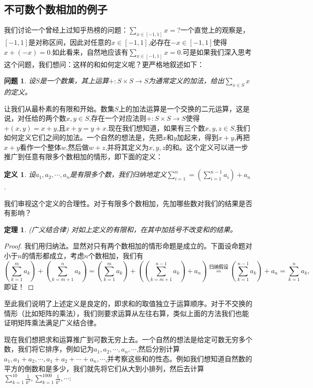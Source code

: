\documentclass{article}
\newtheorem{definition}{定义}[subsection]
\newtheorem{theorem}{定理}[subsection]
\newtheorem{question}{问题}[subsection]
\begin{document}
\subsection{不可数个数相加的例子}
我们讨论一个曾经上过知乎热榜的问题：$\sum_{x\in[-1,1]}x=?$一个直觉上的观察是，$[-1,1]$是对称区间，因此对任意的$x\in[-1,1]$,必存在$-x\in[-1,1]$使得$x+(-x)=0$.如此看来，自然地应该有$\sum_{x\in[-1,1]}x=0$.可是如果我们深入思考这个问题，我们想问：这样的和如何定义呢？更严格地叙述如下：
\begin{question}
设$S$是一个数集，其上运算$+:S\times S\to S$为通常定义的加法，给出$\sum_{x\in S}x$的定义。
\end{question}
让我们从最朴素的有限和开始。数集$S$上的加法运算是一个交换的二元运算，这是说，对任给的两个数$x,y\in S$,存在一个对应法则$+:S\times S\to S$使得$+(x,y)=x+y$,且$x+y=y+x$.现在我们想知道，如果有三个数$x,y,z\in S$,我们如何定义它们之间的加法。一个自然的想法是，先把$x$和$y$加起来，得到$x+y$,再把$x+y$看作一个整体$w$,然后做$w+z$,并将其定义为$x,y,z$的和。这个定义可以进一步推广到任意有限多个数相加的情形，即下面的定义：
\begin{definition}
设$a_1,a_2,\cdots,a_n$是有限多个数，我们归纳地定义$\sum_{i=1}^n=\left(\sum_{i=1}^{n-1}a_i\right)+a_n$.
\end{definition}
我们审视这个定义的合理性。对于有限多个数相加，先加哪些数对我们的结果是否有影响？
\begin{theorem}(广义结合律)
对如上定义的有限和，在其中加括号不改变和的结果。
\end{theorem}
\begin{proof}
我们用归纳法。显然对只有两个数相加的情形命题是成立的。下面设命题对小于$n$的情形都成立，考虑$n$个数相加，我们有
$$
\left( \sum_{k=1}^m{a_k} \right) +\left( \sum_{k=m+1}^n{a_k} \right) =\left( \sum_{k=1}^m{a_k} \right) +\left( \left( \sum_{k=m+1}^{n-1}{a_k} \right) +a_n \right) \overset{\text{归纳假设}}{=}\left( \sum_{k=1}^{n-1}{a_k} \right) +a_n=\sum_{k=1}^n{a_k},
$$
即证！
\end{proof}
至此我们说明了上述定义是良定的，即求和的取值独立于运算顺序。对于不交换的情形（比如矩阵的乘法），我们则要求运算从左往右算，类似上面的方法我们也能证明矩阵乘法满足广义结合律。\par
现在我们想把求和运算推广到可数无穷上去。一个自然的想法是给定可数无穷多个数，我们将它排序，例如记为$a_1,a_2,\cdots,a_n,\cdots$,然后分别计算$a_1,a_1+a_2,\cdots,a_1+a_2+\cdots+a_n,\cdots$,并考察这些和的性态。例如我们想知道自然数的平方的倒数和是多少，我们就先将它们从大到小排列，然后去计算$\sum_{k=1}^{10}\frac{1}{k^2},\sum_{k=1}^{1000}\frac{1}{k^2},\cdots$:
\end{document}
